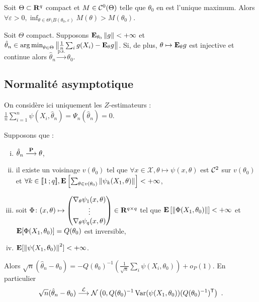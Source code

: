 	\begin{lem}
		Soit $\Theta \subset \mathbf{R}^q$ compact et $M \in \mathcal{C}^0(\Theta)$ telle que $\theta_0$ en est l'unique maximum.
		Alors $\forall \varepsilon > 0, \inf_{\theta \in \Theta \setminus B(\theta_0,\varepsilon)} M(\theta) > M(\theta_0)$.
	\end{lem}

	\begin{pop}
		Soit $\Theta$ compact.
		Supposons $\mathbf{E}_{\theta_0} \left\lVert g\right\rVert < +\infty$ et $\hat{\theta}_n \in \operatorname{arg\, min}_{\theta \in \Theta} \left\lVert\frac{1}{n} \sum_i g(X_i) - \mathbf{E}_{\theta} g\right\rVert$.
		Si, de plus, $\theta \mapsto \mathbf{E}_{\theta} g$ est injective et continue alors $\hat{\theta}_n \overset{\text{p.s.}}{\longrightarrow} \theta_0$.
	\end{pop}


\subsection{Normalité asymptotique}

	On considère ici uniquement les $Z$-estimateurs : $\frac{1}{n} \sum_{i = 1}^n \psi(X_i,\hat{\theta}_n) = \Psi_n(\hat{\theta}_n) = 0$.

	\begin{thm}
		Supposons que :
		\begin{enumerate}[(i)]
			\item $\hat{\theta}_n \overset{\mathbf{P}}{\longrightarrow} \theta$,
			\item il existe un voisinage $v(\theta_0)$ tel que $\forall x \in \mathcal{X}, \theta \mapsto \psi(x,\theta)$ est $\mathcal{C}^2$ sur $v(\theta_0)$ et $\forall k \in \mathopen{}\mathclose{\left[\![1\mathclose{}\mathpunct{};q\right]\!]}, \mathbf{E} \left[ \sum_{\theta \in v(\theta_0)} \left\lVert\psi_k(X_1,\theta)\right\rVert \right] < +\infty$,
			\item soit $\Phi \colon (x,\theta) \mapsto \begin{pmatrix} \nabla_\theta \psi_1(x,\theta) \\ \vdots \\ \nabla_\theta \psi_q(x,\theta) \end{pmatrix} \in \mathbf{R}^{q \times q}$ tel que $\mathbf{E} \left[ \left\lVert\Phi(X_1,\theta_0)\right\rVert \right] < +\infty$ et $\mathbf{E}[ \Phi(X_1,\theta_0) ] = Q(\theta_0)$ est inversible,
			\item $\mathbf{E}[ \left\lVert\psi(X_1,\theta_0)\right\rVert^2 ] < +\infty$.
		\end{enumerate}
		Alors $\sqrt{n}(\hat{\theta}_n - \theta_0) = -Q(\theta_0)^{-1} \left( \frac{1}{\sqrt{n}} \sum_i \psi(X_i,\theta_0) \right) + o_P(1)$.
		En particulier
		$$\sqrt{n}(\hat{\theta}_n - \theta_0) \overset{\mathcal{L}}{\longrightarrow} \mathcal{N} \left( 0, Q(\theta_0)^{-1} \operatorname{Var}(\psi(X_1,\theta_0)) (Q(\theta_0)^{-1})^\mathsf{T} \right)\ .$$
	\end{thm}
